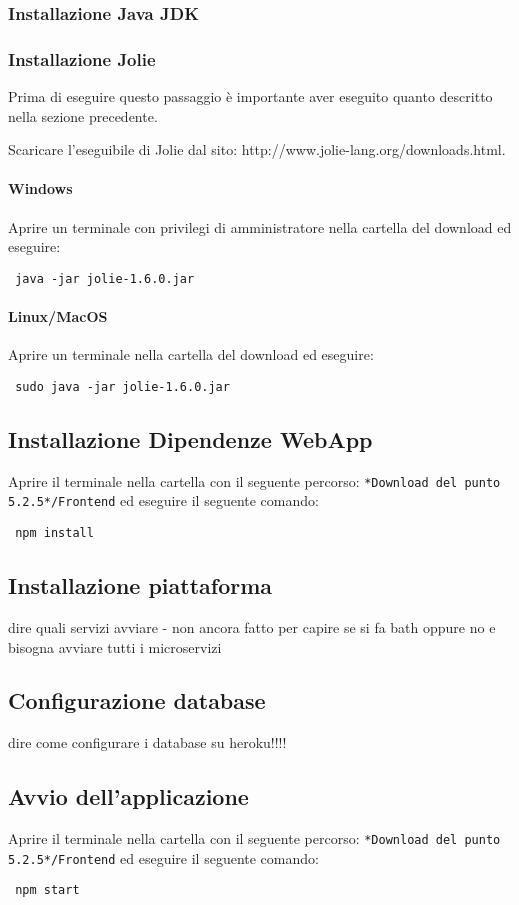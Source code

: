 \subsubsection{Installazione Java JDK}

\subsubsection{Installazione Jolie}
Prima di eseguire questo passaggio è importante aver eseguito quanto descritto nella sezione precedente.

Scaricare l’eseguibile di Jolie dal sito: http://www.jolie-lang.org/downloads.html. 
\paragraph{Windows}
Aprire un terminale con privilegi di amministratore nella cartella del download ed eseguire:
	\begin{center}
	 \verb| java -jar jolie-1.6.0.jar|
	\end{center}
\paragraph{Linux/MacOS}
Aprire un terminale nella cartella del download ed eseguire:
	\begin{center}
	 \verb| sudo java -jar jolie-1.6.0.jar|
	\end{center}
\subsection{Installazione Dipendenze WebApp}
Aprire il terminale nella cartella con il seguente percorso: \verb|*Download del punto 5.2.5*/Frontend| ed eseguire il seguente comando:
	\begin{center}
	\verb| npm install|
\end{center}


\subsection{Installazione piattaforma}
 dire quali servizi avviare
 - non ancora fatto per capire se si fa bath oppure no e bisogna avviare tutti i microservizi

\subsection{Configurazione database}

dire come configurare i database su heroku!!!!

\subsection{Avvio dell'applicazione}
Aprire il terminale nella cartella con il seguente percorso: \verb|*Download del punto 5.2.5*/Frontend| ed eseguire il seguente comando:
\begin{center}
	\verb| npm start|
\end{center}

